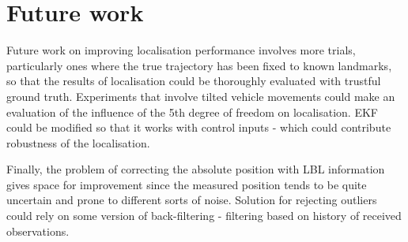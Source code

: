 \section{Future work}
Future work on improving localisation performance involves more trials, particularly ones where the true trajectory has been fixed to known landmarks, so that the results of localisation could be thoroughly evaluated with trustful ground truth. Experiments that involve tilted vehicle movements could make an evaluation of the influence of the 5th degree of freedom on localisation. EKF could be modified so that it works with control inputs - which could contribute robustness of the localisation. 

Finally, the problem of correcting the absolute position with LBL information gives space for improvement since the measured position tends to be quite uncertain and prone to different sorts of noise. Solution for rejecting outliers could rely on some version of back-filtering - filtering based on history of received observations.          